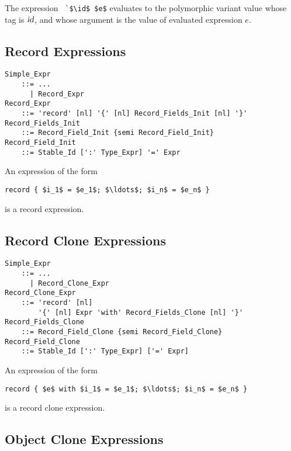 The expression ~\lstinline!`$\id$ $e$! evaluates to the polymorphic variant value whose tag is $\mbox{\sl id}$, and whose argument is the value of evaluated expression $e$. 





\subsection{Record Expressions}
\label{sec:record-expressions}

\grammar\begin{lstlisting}
Simple_Expr
    ::= ...
      | Record_Expr
Record_Expr 
    ::= 'record' [nl] '{' [nl] Record_Fields_Init [nl] '}'
Record_Fields_Init
    ::= Record_Field_Init {semi Record_Field_Init}
Record_Field_Init
    ::= Stable_Id [':' Type_Expr] '=' Expr
\end{lstlisting}

An expression of the form
\begin{lstlisting}
record { $i_1$ = $e_1$; $\ldots$; $i_n$ = $e_n$ }
\end{lstlisting}
is a record expression. 






\subsection{Record Clone Expressions}
\label{sec:record-clone-expressions}

\grammar\begin{lstlisting}
Simple_Expr 
    ::= ...
      | Record_Clone_Expr
Record_Clone_Expr
    ::= 'record' [nl] 
        '{' [nl] Expr 'with' Record_Fields_Clone [nl] '}'
Record_Fields_Clone 
    ::= Record_Field_Clone {semi Record_Field_Clone}
Record_Field_Clone 
    ::= Stable_Id [':' Type_Expr] ['=' Expr]
\end{lstlisting}

An expression of the form
\begin{lstlisting}
record { $e$ with $i_1$ = $e_1$; $\ldots$; $i_n$ = $e_n$ }
\end{lstlisting}
is a record clone expression. 





\subsection{Object Clone Expressions}
\label{sec:object-clone-expressions}

